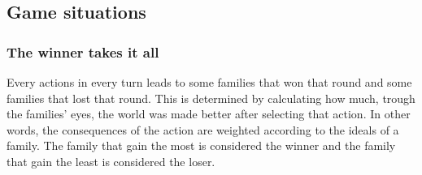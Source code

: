 \documentclass[11pt,a4paper]{article}
\begin{document}
\subsection{Game situations}

  \subsubsection{The winner takes it all}
Every actions in every turn leads to some families that won that round and some families that lost that round. This is determined by calculating how much, trough the families' eyes, the world was made better after selecting that action. In other words, the consequences of the action are weighted according to the ideals of a family. The family that gain the most is considered the winner and the family that gain the least is considered the loser. 
\end{document}

